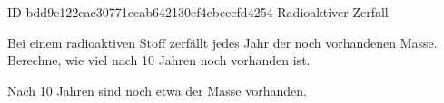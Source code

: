 \begin{exercise}
      {ID-bdd9e122cac30771ceab642130ef4cbeeefd4254}
      {Radioaktiver Zerfall}
  \ifproblem\problem\par
    Bei einem radioaktiven Stoff zerfällt jedes Jahr  der noch
    vorhandenen Masse. Berechne, wie viel nach 10 Jahren noch vorhanden
    ist.
  \fi
  \ifoutcome\outcome\par
    Nach 10 Jahren sind noch etwa  der Masse vorhanden.
  \fi
\end{exercise}
